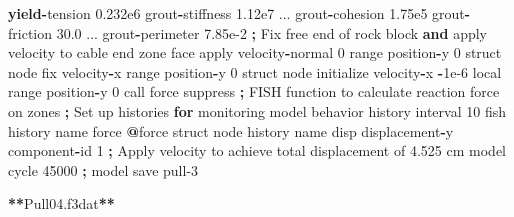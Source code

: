 \documentclass[a4paper, nobind]{templates/ociamthesis}
\newenvironment{Shaded}{\begin{snugshade}}{\end{snugshade}}
\newcommand{\BuiltInTok}[1]{#1}
\newcommand{\ControlFlowTok}[1]{\textcolor[rgb]{0.13,0.29,0.53}{\textbf{#1}}}
\newcommand{\DecValTok}[1]{\textcolor[rgb]{0.00,0.00,0.81}{#1}}
\newcommand{\FloatTok}[1]{\textcolor[rgb]{0.00,0.00,0.81}{#1}}
\newcommand{\KeywordTok}[1]{\textcolor[rgb]{0.13,0.29,0.53}{\textbf{#1}}}
\newcommand{\NormalTok}[1]{#1}
\newcommand{\OperatorTok}[1]{\textcolor[rgb]{0.81,0.36,0.00}{\textbf{#1}}}
\newcommand{\StringTok}[1]{\textcolor[rgb]{0.31,0.60,0.02}{#1}}
\renewenvironment{Shaded}
{
  \vspace{10pt}%
  \begin{snugshade}%
}{%
  \end{snugshade}%
  \vspace{8pt}%
}
\begin{document}
\begin{Shaded}
\begin{Highlighting}[]
                          \ControlFlowTok{yield}\OperatorTok{{-}}\NormalTok{tension }\FloatTok{0.232e6}\NormalTok{ grout}\OperatorTok{{-}}\NormalTok{stiffness }\FloatTok{1.12e7}\NormalTok{ ...}
\NormalTok{                          grout}\OperatorTok{{-}}\NormalTok{cohesion }\FloatTok{1.75e5}\NormalTok{ grout}\OperatorTok{{-}}\NormalTok{friction }\FloatTok{30.0}\NormalTok{ ...}
\NormalTok{                          grout}\OperatorTok{{-}}\NormalTok{perimeter }\FloatTok{7.85e{-}2}
    \OperatorTok{;}\NormalTok{ Fix free end of rock block }\KeywordTok{and} \BuiltInTok{apply}\NormalTok{ velocity to cable end}
\NormalTok{    zone face }\BuiltInTok{apply}\NormalTok{ velocity}\OperatorTok{{-}}\NormalTok{normal }\DecValTok{0} \BuiltInTok{range}\NormalTok{ position}\OperatorTok{{-}}\NormalTok{y }\DecValTok{0}
\NormalTok{    struct node fix velocity}\OperatorTok{{-}}\NormalTok{x }\BuiltInTok{range}\NormalTok{ position}\OperatorTok{{-}}\NormalTok{y }\DecValTok{0}
\NormalTok{    struct node initialize velocity}\OperatorTok{{-}}\NormalTok{x }\OperatorTok{{-}}\FloatTok{1e{-}6}\NormalTok{ local }\BuiltInTok{range}\NormalTok{ position}\OperatorTok{{-}}\NormalTok{y }\DecValTok{0}
\NormalTok{    call }\StringTok{\textquotesingle{}force\textquotesingle{}}\NormalTok{ suppress }\OperatorTok{;}\NormalTok{ FISH function to calculate reaction force on zones}
    \OperatorTok{;}\NormalTok{ Set up histories }\ControlFlowTok{for}\NormalTok{ monitoring model behavior}
\NormalTok{    history interval }\DecValTok{10}
\NormalTok{    fish history name }\StringTok{\textquotesingle{}force\textquotesingle{}} \OperatorTok{@}\NormalTok{force}
\NormalTok{    struct node history name }\StringTok{\textquotesingle{}disp\textquotesingle{}}\NormalTok{ displacement}\OperatorTok{{-}}\NormalTok{y component}\OperatorTok{{-}}\BuiltInTok{id} \DecValTok{1}
    \OperatorTok{;}\NormalTok{ Apply velocity to achieve total displacement of }\FloatTok{4.525}\NormalTok{ cm}
\NormalTok{    model cycle }\DecValTok{45000}
    \OperatorTok{;}
\NormalTok{    model save }\StringTok{\textquotesingle{}pull{-}3\textquotesingle{}}

\OperatorTok{**}\NormalTok{Pull04.f3dat}\OperatorTok{**}


\end{Highlighting}
\end{Shaded}
\end{document}
